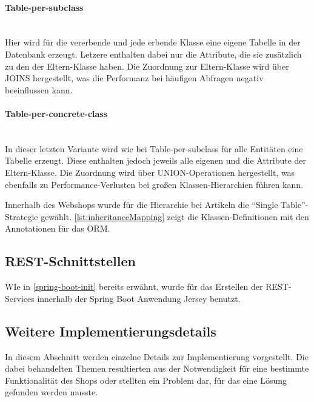 \paragraph{Table-per-subclass}$\;$ \\
Hier wird für die vererbende und jede erbende Klasse eine eigene Tabelle in der Datenbank erzeugt. Letzere enthalten dabei nur die Attribute, die sie zusätzlich zu den der Eltern-Klasse haben. Die Zuordnung zur Eltern-Klasse wird über JOINS hergestellt, was die Performanz bei häufigen Abfragen negativ beeinflussen kann.
\paragraph{Table-per-concrete-class}$\;$ \\
In dieser letzten Variante wird wie bei Table-per-subclass für alle Entitäten eine Tabelle erzeugt. Diese enthalten jedoch jeweils alle eigenen und die Attribute der Eltern-Klasse.
Die Zuordnung wird über UNION-Operationen hergestellt, was ebenfalls zu Performance-Verlusten bei großen Klassen-Hierarchien führen kann.

Innerhalb des Webshops wurde für die Hierarchie bei Artikeln die \enquote{Single Table}-Strategie gewählt.
\cref{lst:inheritanceMapping} zeigt die Klassen-Definitionen mit den Annotationen für das \acs{ORM}.
\\


\subsection{REST-Schnittstellen}
WIe in \cref{spring-boot-init} bereits erwähnt, wurde für das Erstellen der REST-Services innerhalb der Spring Boot Anwendung Jersey benutzt.


\subsection{Weitere Implementierungsdetails}
In diesem Abschnitt werden einzelne Details zur Implementierung vorgestellt.
Die dabei behandelten Themen resultierten aus der Notwendigkeit für eine bestimmte Funktionalität des Shops oder stellten ein Problem dar, für das eine Lösung gefunden werden musste.
